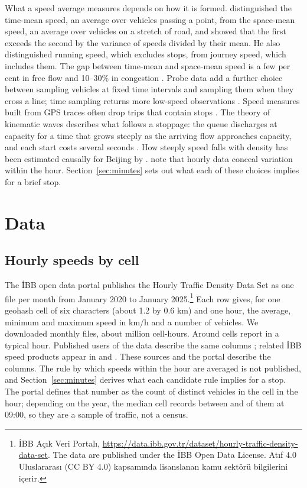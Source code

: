 \documentclass[11pt,a4paper]{article}
\begin{document}
What a speed average measures depends on how it is formed. \citet{wardrop1952} distinguished the
time-mean speed, an average over vehicles passing a point, from the space-mean speed, an average
over vehicles on a stretch of road, and showed that the first exceeds the second by the variance of
speeds divided by their mean. He also distinguished running speed, which excludes stops, from journey
speed, which includes them. The gap between time-mean and space-mean speed is a few per cent in free
flow and 10--30\% in congestion \citep{rakha2005,knoop2009}. Probe data add a further choice between
sampling vehicles at fixed time intervals and sampling them when they cross a line; time sampling
returns more low-speed observations \citep{herrera2010}. Speed measures built from GPS traces often
drop trips that contain stops \citep{kreindler2024}. The theory of kinematic waves describes what
follows a stoppage: the queue discharges at capacity for a time that grows steeply as the arriving
flow approaches capacity, and each start costs several seconds
\citep{lighthill1955,richards1956}. How steeply speed falls with density has been estimated causally
for Beijing by \citet{yang2020}. \citet{adler2021} note that hourly data
conceal variation within the hour. Section~\ref{sec:minutes} sets out what each of these choices
implies for a brief stop.

\section{Data}

\subsection{Hourly speeds by cell}

The İBB open data portal publishes the Hourly Traffic Density Data Set as one file per month from
January 2020 to January 2025.\footnote{İBB Açık Veri Portalı,
\url{https://data.ibb.gov.tr/dataset/hourly-traffic-density-data-set}. The data are published under
the İBB Open Data License. Atıf 4.0 Uluslararası (CC BY 4.0) kapsamında lisanslanan kamu sektörü
bilgilerini içerir.} Each row gives, for one geohash cell of six characters (about 1.2 by 0.6 km)
and one hour, the average, minimum and maximum speed in km/h and a number of vehicles. We downloaded
\nMonths{} monthly files, about \cellHours{} million cell-hours. Around \cellsAll{} cells report in a
typical hour. Published users of the data describe the same columns
\citep{utku2023,ozkurt2025,tanberk2023}; related İBB speed products appear in \citet{olug2024} and
\citet{energies2021}. These sources and
the portal describe the columns. The rule by which speeds within the hour are averaged is not
published, and Section~\ref{sec:minutes} derives what each candidate rule implies for a stop. The portal defines that number as the count of distinct
vehicles in the cell in the hour; depending on the year, the median cell records between \vehLo{} and \vehHi{} of them at
09:00, so they are a sample of traffic, not a census.
\end{document}
